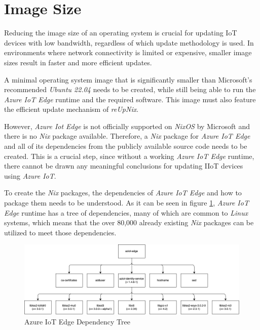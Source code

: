 \section{Image Size}
\label{sec:image-size}
Reducing the image size of an operating system is crucial for updating IoT devices
with low bandwidth, regardless of which update methodology is used.
In environments where network connectivity is limited or expensive,
smaller image sizes result in faster and more efficient updates.

A minimal operating system image that is significantly smaller
than Microsoft's recommended \textit{Ubuntu 22.04} needs to be created, while still being able to run the
\textit{Azure IoT Edge} runtime and the required software. This image must also
feature the efficient update mechanism of \textit{reUpNix}.

However, \textit{Azure Iot Edge} is not officially supported on \textit{NixOS}
by Microsoft and there is no \textit{Nix} package available. Therefore, a \textit{Nix} package
for \textit{Azure IoT Edge} and all of its dependencies from the publicly available source code
needs to be created. This is a crucial step, since
without a working \textit{Azure IoT Edge} runtime, there cannot be drawn any meaningful
conclusions for updating \ac{IIoT} devices using \textit{Azure IoT}.

To create the \textit{Nix} packages, the dependencies of
\textit{Azure IoT Edge} and how to package them needs to be understood. As it can be seen in figure
\ref{fig:dependency-tree}, \textit{Azure IoT Edge} runtime has a tree of dependencies,
many of which are common to \textit{Linux} systems, which means that the over 80,000 already
existing \textit{Nix} packages can be utilized to meet those dependencies.
\clearpage

\begin{figure}[H]
    \centering
    \includegraphics[width=\textwidth]{fig/dependecy-tree.drawio.png}
    \caption{Azure IoT Edge Dependency Tree}
    \label{fig:dependency-tree}
\end{figure}


